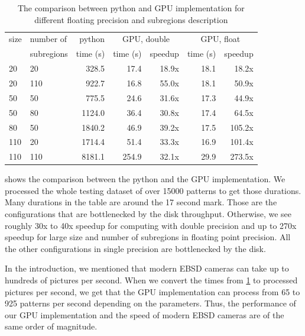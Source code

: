 \begin{table}[]
	\centering
	\begin{tabular}{@{}ll|r|rr|rr@{}}
		size & number of  &                        python & \multicolumn{2}{c|}{GPU, double} & \multicolumn{2}{c}{GPU, float} \\
		     & subregions & \multicolumn{1}{c|}{time (s)} & time (s) &               speedup & time (s) &             speedup \\ \midrule
		20   & 20         &                         328.5 &     17.4 &                 18.9x &     18.1 &               18.2x \\
		20   & 110        &                         922.7 &     16.8 &                 55.0x &     18.1 &               50.9x \\
		50   & 50         &                         775.5 &     24.6 &                 31.6x &     17.3 &               44.9x \\
		50   & 80         &                        1124.0 &     36.4 &                 30.8x &     17.4 &               64.5x \\
		80   & 50         &                        1840.2 &     46.9 &                 39.2x &     17.5 &              105.2x \\
		110  & 20         &                        1714.4 &     51.4 &                 33.3x &     16.9 &              101.4x \\
		110  & 110        &                        8181.1 &    254.9 &                 32.1x &     29.9 &              273.5x
	\end{tabular}
	\caption{The comparison between python and GPU implementation for different floating precision and subregions description}
	\label{full-size-table}
\end{table}

 shows the comparison between the python and the GPU implementation. We processed the whole testing dataset of over 15000 patterns to get those durations. Many durations in the table are around the 17 second mark. Those are the configurations that are bottlenecked by the disk throughput. Otherwise, we see roughly 30x to 40x speedup for computing with double precision and up to 270x speedup for large size and number of subregions in floating point precision. All the other configurations in single precision are bottlenecked by the disk.

In the introduction, we mentioned that modern EBSD cameras can take up to hundreds of pictures per second. When we convert the times from \cref{full-size-table} to processed pictures per second, we get that the GPU implementation can process from 65 to 925 patterns per second depending on the parameters. Thus, the performance of our GPU implementation and the speed of modern EBSD cameras are of the same order of magnitude.


